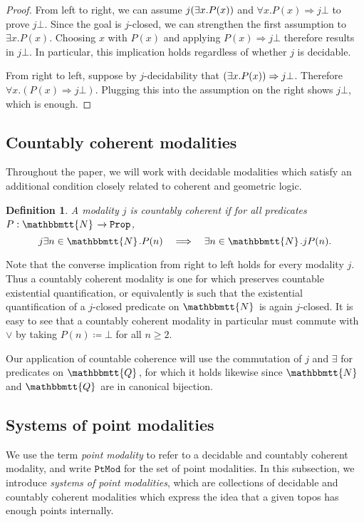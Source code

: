 \documentclass[reqno,11pt]{amsproc}
\theoremstyle{plain}
\newtheorem{definition}[theorem]{Definition}
\theoremstyle{definition}
\newcommand{\Const}[1]{\mathtt{#1}}
\renewcommand{\to}[1][]{\xrightarrow{#1}}
\newcommand{\internal}[1]{\raisebox{-.03ex}{$\mathbbmtt{#1}$}}
\newcommand{\hs}{\hspace{1pt}}
\newcommand{\tnn}{\internal{N}\hs}
\newcommand{\tqq}{\internal{Q}\hs}
\newcommand{\prop}{\Const{Prop}}
\newcommand{\ptmod}{\mathtt{PtMod}}	%
\newcommand{\imp}{\Rightarrow}
\let\originalleft\left
\let\originalright\right
\renewcommand{\left}{\mathopen{}\mathclose\bgroup\originalleft}
\renewcommand{\right}{\aftergroup\egroup\originalright}
\numberwithin{equation}{section}
\begin{document}
\begin{proof}
	From left to right, we can assume $j \left( \exists x. P(x)\right)$ and $\forall x. P(x) \imp j\bot$ to prove $j\bot$. Since the goal is $j$-closed, we can strengthen the first assumption to $\exists x. P(x)$. Choosing $x$ with $P(x)$ and applying $P(x) \imp j\bot$ therefore results in $j\bot$. In particular, this implication holds regardless of whether $j$ is decidable.

	From right to left, suppose by $j$-decidability that $\left( \exists x. P(x) \right) \imp j\bot$. Therefore $\forall x. (P(x) \imp j\bot)$. Plugging this into the assumption on the right shows $j\bot$, which is enough.
\end{proof}

\subsection{Countably coherent modalities}

Throughout the paper, we will work with decidable modalities which satisfy an additional condition closely related to coherent and geometric logic.

\begin{definition}
	\label{countably_coherent}
	A modality $j$ is \emph{countably coherent} if for all predicates $P : \tnn \to \prop$,
	\[
		j \exists n \in \tnn . P(n) \quad \Longrightarrow \quad \exists n \in \tnn . jP(n).
	\]
\end{definition}

Note that the converse implication from right to left holds for every modality $j$. Thus a countably coherent modality is one for which preserves countable existential quantification, or equivalently is such that the existential quantification of a $j$-closed predicate on $\tnn$ is again $j$-closed. It is easy to see that a countably coherent modality in particular must commute with $\lor$ by taking $P(n) \coloneqq \bot$ for all $n \ge 2$.

Our application of countable coherence will use the commutation of $j$ and $\exists$ for predicates on $\tqq$, for which it holds likewise since $\tnn$ and $\tqq$ are in canonical bijection.

\subsection{Systems of point modalities}
\label{axioms_soundness}

We use the term \emph{point modality} to refer to a decidable and countably coherent modality, and write $\ptmod$ for the set of point modalities. 
In this subsection, we introduce \emph{systems of point modalities}, which are collections of decidable and countably coherent modalities which express the idea that a given topos has enough points internally.
\end{document}
